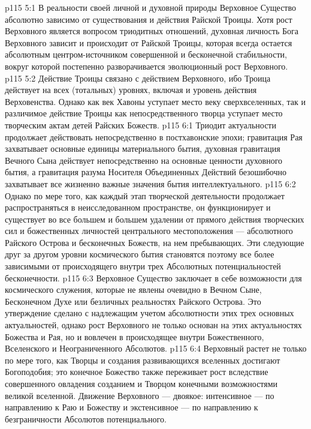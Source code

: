 \vs p115 5:1 В реальности своей личной и духовной природы Верховное Существо абсолютно зависимо от существования и действия Райской Троицы. Хотя рост Верховного является вопросом триодитных отношений, духовная личность Бога Верховного зависит и происходит от Райской Троицы, которая всегда остается абсолютным центром\hyp{}источником совершенной и бесконечной стабильности, вокруг которой постепенно разворачивается эволюционный рост Верховного.
\vs p115 5:2 Действие Троицы связано с действием Верховного, ибо Троица действует на всех (тотальных) уровнях, включая и уровень действия Верховенства. Однако как век Хавоны уступает место веку сверхвселенных, так и различимое действие Троицы как непосредственного творца уступает место творческим актам детей Райских Божеств.
\vs p115 6:1 Триодит актуальности продолжает действовать непосредственно в постхавонские эпохи; гравитация Рая захватывает основные единицы материального бытия, духовная гравитация Вечного Сына действует непосредственно на основные ценности духовного бытия, а гравитация разума Носителя Объединенных Действий безошибочно захватывает все жизненно важные значения бытия интеллектуального.
\vs p115 6:2 Однако по мере того, как каждый этап творческой деятельности продолжает распространяться в неисследованном пространстве, он функционирует и существует во все большем и большем удалении от прямого действия творческих сил и божественных личностей центрального местоположения --- абсолютного Райского Острова и бесконечных Божеств, на нем пребывающих. Эти следующие друг за другом уровни космического бытия становятся поэтому все более зависимыми от происходящего внутри трех Абсолютных потенциальностей бесконечности.
\vs p115 6:3 Верховное Существо заключает в себе возможности для космического служения, которые не явлены очевидно в Вечном Сыне, Бесконечном Духе или безличных реальностях Райского Острова. Это утверждение сделано с надлежащим учетом абсолютности этих трех основных актуальностей, однако рост Верховного не только основан на этих актуальностях Божества и Рая, но и вовлечен в происходящее внутри Божественного, Вселенского и Неограниченного Абсолютов.
\vs p115 6:4 \pc Верховный растет не только по мере того, как Творцы и создания развивающихся вселенных достигают Богоподобия; это конечное Божество также переживает рост вследствие совершенного овладения созданием и Творцом конечными возможностями великой вселенной. Движение Верховного --- двоякое: интенсивное --- по направлению к Раю и Божеству и экстенсивное --- по направлению к безграничности Абсолютов потенциального.
